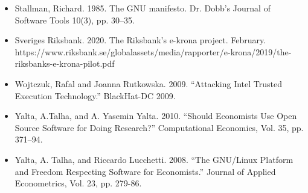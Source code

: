 \documentclass[10pt,spanish]{article}
\begin{document}
\begin{itemize}
\item Stallman, Richard. 1985. The GNU manifesto. Dr. Dobb's Journal of
Software Tools 10(3), pp. 30--35.
\end{itemize}

\begin{itemize}
\item Sveriges Riksbank. 2020. The Riksbank's e-krona project. February.
https://www.riksbank.se/globalassets/media/rapporter/e-krona/2019/the-riksbanks-e-krona-pilot.pdf
\end{itemize}

\begin{itemize}
\item Wojtczuk, Rafal and Joanna Rutkowska. 2009. ``Attacking Intel Trusted
Execution Technology.'' BlackHat-DC 2009.
\end{itemize}

\begin{itemize}
\item Yalta, A.Talha, and A. Yasemin Yalta. 2010. ``Should Economists Use Open
Source Software for Doing Research?'' Computational Economics, Vol. 35,
pp. 371--94.
\end{itemize}

\begin{itemize}
\item Yalta, A. Talha, and Riccardo Lucchetti. 2008. ``The GNU/Linux Platform
and Freedom Respecting Software for Economists.'' Journal of Applied
Econometrics, Vol. 23, pp. 279-86.
\end{itemize}



\end{document}
